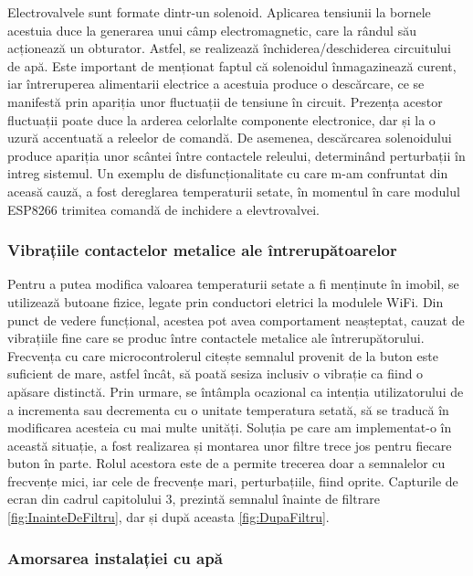 	Electrovalvele sunt formate dintr-un solenoid. Aplicarea tensiunii la bornele acestuia duce la generarea unui câmp electromagnetic, care la rândul său acționează un obturator. Astfel, se realizează închiderea/deschiderea circuitului de apă. Este important de menționat faptul că solenoidul înmagazinează curent, iar întreruperea alimentarii electrice a acestuia produce o descărcare, ce se manifestă prin apariția unor fluctuații de tensiune în circuit. Prezența acestor fluctuații poate duce la arderea celorlalte componente electronice, dar și la o uzură accentuată a releelor de comandă. De asemenea, descărcarea solenoidului produce apariția unor scântei între contactele releului, determinând perturbații în intreg sistemul. Un exemplu de disfuncționalitate cu care m-am confruntat din aceasă cauză, a fost dereglarea temperaturii setate, în momentul în care modulul ESP8266 trimitea comandă de inchidere a elevtrovalvei.   

\subsubsection{Vibrațiile contactelor metalice ale întrerupătoarelor}

	Pentru a putea modifica valoarea temperaturii setate a fi menținute în imobil, se utilizează butoane fizice, legate prin conductori eletrici la modulele WiFi. Din punct de vedere funcțional, acestea pot avea comportament neașteptat, cauzat de vibrațiile fine care se produc între contactele metalice ale întrerupătorului. Frecvența cu care microcontrolerul citește semnalul provenit de la buton este suficient de mare, astfel încât, să poată sesiza inclusiv o vibrație ca fiind o apăsare distinctă. Prin urmare, se întâmpla ocazional ca intenția utilizatorului de a incrementa sau decrementa cu o unitate temperatura setată, să se traducă în modificarea acesteia cu mai multe unități. Soluția pe care am implementat-o în această situație, a fost realizarea și montarea unor filtre trece jos pentru fiecare buton în parte. Rolul acestora este de a permite trecerea doar a semnalelor cu frecvențe mici, iar cele de frecvențe mari, perturbațiile, fiind oprite. Capturile de ecran din cadrul capitolului 3, prezintă semnalul înainte de filtrare \ref{fig:InainteDeFiltru}, dar și după aceasta \ref{fig:DupaFiltru}.

\subsubsection{Amorsarea instalației cu apă}

